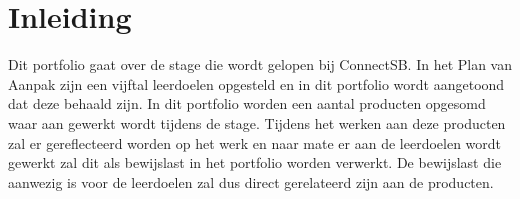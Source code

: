 \setcounter{page}{1}

\section{Inleiding}
Dit portfolio gaat over de stage die wordt gelopen bij ConnectSB. In het Plan van Aanpak zijn een vijftal leerdoelen opgesteld en in dit portfolio wordt aangetoond dat deze behaald zijn.
\newline
In dit portfolio worden een aantal producten opgesomd waar aan gewerkt wordt tijdens de stage. Tijdens het werken aan deze producten zal er gereflecteerd worden op het werk en naar mate er aan de leerdoelen wordt gewerkt zal dit als bewijslast in het portfolio worden verwerkt. De bewijslast die aanwezig is voor de leerdoelen zal dus direct gerelateerd zijn aan de producten.

\clearpage